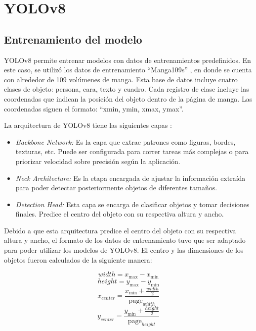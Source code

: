 \documentclass[conference]{IEEEtran}
\begin{document}
\hypertarget{yolov8}{%
\section{YOLOv8}\label{yolov8}}

\subsection{Entrenamiento del modelo}\label{entrenamiento-del-modelo}
YOLOv8 permite entrenar modelos con datos de entrenamientos predefinidos. En este caso, se utilizó los datos de entrenamiento ``Manga109s'' \cite{aizawa2020manga109}, en donde se cuenta con alrededor de 109 volúmenes de manga. Esta base de datos incluye cuatro clases de objeto: persona, cara, texto y cuadro. Cada registro de clase incluye las coordenadas que indican la posición del objeto dentro de la página de manga. Las coordenadas siguen el formato: ``xmin, ymin, xmax, ymax''.

La arquitectura de YOLOv8 tiene las siguientes capas \cite{torres2025yolov8}:
\begin{itemize}
  \item \emph{Backbone Network:} Es la capa que extrae patrones como figuras, bordes, texturas, etc. Puede ser configurada para correr tareas más complejas o para priorizar velocidad sobre precisión según la aplicación.
  \item \emph{Neck Architecture:} Es la etapa encargada de ajustar la información extraída para poder detectar posteriormente objetos de diferentes tamaños.
  \item \emph{Detection Head:} Esta capa se encarga de clasificar objetos y tomar decisiones finales. Predice el centro del objeto con su respectiva altura y ancho.
\end{itemize}

Debido a que esta arquitectura predice el centro del objeto con su respectiva altura y ancho, el formato de los datos de entrenamiento tuvo que ser adaptado para poder utilizar los modelos de YOLOv8. El centro y las dimensiones de los objetos fueron calculados de la siguiente manera:

\[width = x_{\max} - x_{\min}\]
\[height = y_{\max} - y_{\min}\]
\[x_{center} = \frac{x_{\min} + \frac{width}{2}}{\mathrm{page}_{width}}\]
\[y_{center} = \frac{y_{\min} + \frac{height}{2}}{\mathrm{page}_{height}}\]
\end{document}
